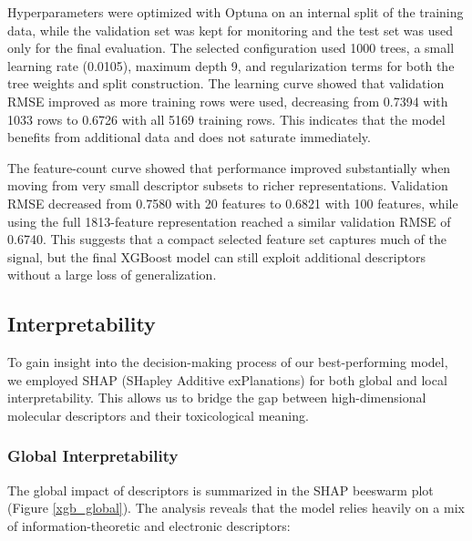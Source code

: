 \documentclass[10pt,a4paper,twocolumn]{article}
\begin{document}
Hyperparameters were optimized with Optuna on an internal split of the training
data, while the validation set was kept for monitoring and the test set was used
only for the final evaluation. The selected configuration used 1000 trees, a
small learning rate (0.0105), maximum depth 9, and regularization terms for both
the tree weights and split construction. The learning curve showed that
validation RMSE improved as more training rows were used, decreasing from 0.7394
with 1033 rows to 0.6726 with all 5169 training rows. This indicates that the
model benefits from additional data and does not saturate immediately.

The feature-count curve showed that performance improved substantially when
moving from very small descriptor subsets to richer representations. Validation
RMSE decreased from 0.7580 with 20 features to 0.6821 with 100 features, while
using the full 1813-feature representation reached a similar validation RMSE of
0.6740. This suggests that a compact selected feature set captures much of the
signal, but the final XGBoost model can still exploit additional descriptors
without a large loss of generalization.

\subsection{Interpretability}
To gain insight into the decision-making process of our best-performing model, we employed SHAP (SHapley Additive exPlanations) for both global and local interpretability. This allows us to bridge the gap between high-dimensional molecular descriptors and their toxicological meaning.

\subsubsection{Global Interpretability}
The global impact of descriptors is summarized in the SHAP beeswarm plot (Figure \ref{xgb_global}). The analysis reveals that the model relies heavily on a mix of information-theoretic and electronic descriptors:
\end{document}
